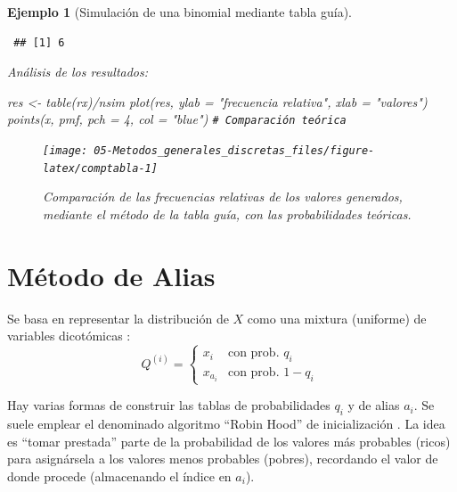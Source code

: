 \documentclass[
  10pt,
]{book}
\newenvironment{Shaded}{\begin{snugshade}}{\end{snugshade}}
\newcommand{\AttributeTok}[1]{\textcolor[rgb]{0.77,0.63,0.00}{#1}}
\newcommand{\CommentTok}[1]{\textcolor[rgb]{0.56,0.35,0.01}{\textit{#1}}}
\newcommand{\DecValTok}[1]{\textcolor[rgb]{0.00,0.00,0.81}{#1}}
\newcommand{\FunctionTok}[1]{\textcolor[rgb]{0.00,0.00,0.00}{#1}}
\newcommand{\NormalTok}[1]{#1}
\newcommand{\OtherTok}[1]{\textcolor[rgb]{0.56,0.35,0.01}{#1}}
\newcommand{\SpecialCharTok}[1]{\textcolor[rgb]{0.00,0.00,0.00}{#1}}
\newcommand{\StringTok}[1]{\textcolor[rgb]{0.31,0.60,0.02}{#1}}
\theoremstyle{break}
\newtheorem{example}{Ejemplo}[chapter]
\theoremstyle{nonumberplain}
\renewcommand{\CommentTok}[1]{\textcolor[rgb]{0.41,0.41,0.41}{\texttt{#1}}}
\begin{document}
\begin{example}[Simulación de una binomial mediante tabla guía]
\begin{verbatim}
 ## [1] 6
\end{verbatim}

Análisis de los resultados:

\begin{Shaded}
\begin{Highlighting}[]
\NormalTok{res }\OtherTok{\textless{}{-}} \FunctionTok{table}\NormalTok{(rx)}\SpecialCharTok{/}\NormalTok{nsim}
\FunctionTok{plot}\NormalTok{(res, }\AttributeTok{ylab =} \StringTok{"frecuencia relativa"}\NormalTok{, }\AttributeTok{xlab =} \StringTok{"valores"}\NormalTok{)}
\FunctionTok{points}\NormalTok{(x, pmf, }\AttributeTok{pch =} \DecValTok{4}\NormalTok{, }\AttributeTok{col =} \StringTok{"blue"}\NormalTok{)  }\CommentTok{\# Comparación teórica}
\end{Highlighting}
\end{Shaded}

\begin{figure}[!htbp]

{\centering \texttt{[image: 05-Metodos\_generales\_discretas\_files/figure-latex/comptabla-1]} 

}

\caption{Comparación de las frecuencias relativas de los valores generados, mediante el método de la tabla guía, con las probabilidades teóricas.}\label{fig:comptabla}
\end{figure}

\end{example}

\hypertarget{alias}{%
\section{Método de Alias}\label{alias}}

Se basa en representar la distribución de \(X\) como una mixtura
(uniforme) de variables dicotómicas \citep{walker1977}:
\[Q^{(i)}=\left\{ 
\begin{array}{ll}
x_{i} & \text{con prob. } q_{i} \\ 
x_{a_{i}} & \text{con prob. } 1-q_{i}
\end{array}
\ \right.\]

Hay varias formas de construir las tablas de probabilidades \(q_i\) y de alias \(a_i\).
Se suele emplear el denominado algoritmo ``Robin Hood'' de inicialización \citep{kronmal1979}.
La idea es ``tomar prestada'' parte de la probabilidad de los valores más probables (ricos) para asignársela a los valores menos probables (pobres), recordando el valor de donde procede (almacenando el índice en \(a_i\)).
\end{document}
